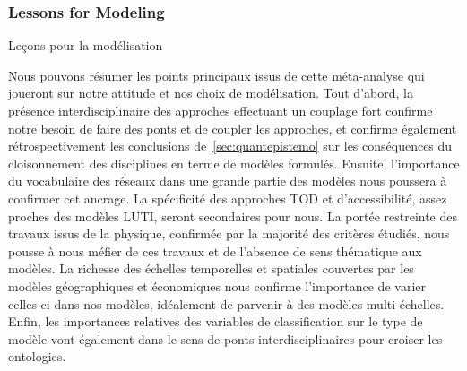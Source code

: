 


\subsubsection{Lessons for Modeling}{Leçons pour la modélisation}


Nous pouvons résumer les points principaux issus de cette méta-analyse qui joueront sur notre attitude et nos choix de modélisation. Tout d'abord, la présence interdisciplinaire des approches effectuant un couplage fort confirme notre besoin de faire des ponts et de coupler les approches, et confirme également rétrospectivement les conclusions de~\ref{sec:quantepistemo} sur les conséquences du cloisonnement des disciplines en terme de modèles formulés. Ensuite, l'importance du vocabulaire des réseaux dans une grande partie des modèles nous poussera à confirmer cet ancrage. La spécificité des approches TOD et d'accessibilité, assez proches des modèles LUTI, seront secondaires pour nous. La portée restreinte des travaux issus de la physique, confirmée par la majorité des critères étudiés, nous pousse à nous méfier de ces travaux et de l'absence de sens thématique aux modèles. La richesse des échelles temporelles et spatiales couvertes par les modèles géographiques et économiques nous confirme l'importance de varier celles-ci dans nos modèles, idéalement de parvenir à des modèles multi-échelles. Enfin, les importances relatives des variables de classification sur le type de modèle vont également dans le sens de ponts interdisciplinaires pour croiser les ontologies.










\stars



